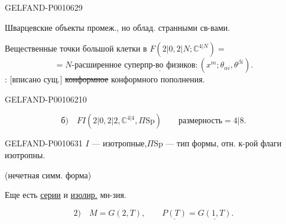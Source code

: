 \begin{GelfandAdjacentEvidence}{GELFAND-P001062}{9}


Шварцевские объекты промеж., но облад. странными св-вами.

Вещественные точки большой клетки в \(F(2|0,2|N;\mathbb C^{4|N})=\)
\[
=N\text{-расширенное }\underline{\text{суперпр-во физиков}}:
 (x^m;\theta_{\alpha i},\theta^{\beta i}).
\]
: [вписано сущ.] \sout{конформное}
конформного пополнения.
\end{GelfandAdjacentEvidence}
\begin{GelfandAdjacentEvidence}{GELFAND-P001062}{10}


\[
\text{б)}\quad FI(2|0,2|2,\mathbb C^{4|4},\Pi\mathrm{Sp})
  \qquad \text{размерность}=4|8.
\]
\end{GelfandAdjacentEvidence}



\begin{GelfandAdjacentEvidence}{GELFAND-P001063}{1}
\(I\) — изотропные,\quad \(\Pi\mathrm{Sp}\) — тип формы, отн. к-рой флаги изотропны.

(нечетная симм. форма)

Еще есть \underline{серии} и \underline{изолир.} мн-зия.
\end{GelfandAdjacentEvidence}


\[
2)\quad M=G(2,T),\qquad \underline{P(T)}=\underline{G(1,T)}.
\]


